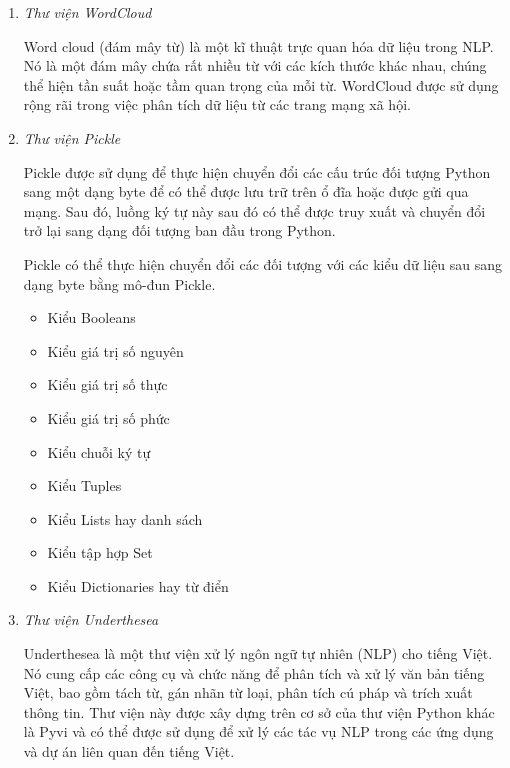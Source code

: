 \begin{enumerate}
    \item \textit{Thư viện WordCloud}

          Word cloud (đám mây từ) là một kĩ thuật trực quan hóa dữ liệu trong NLP. Nó là một đám mây chứa rất nhiều từ với các kích thước khác nhau, chúng thể hiện tần suất hoặc tầm quan trọng của mỗi từ. WordCloud được sử dụng rộng rãi trong việc phân tích dữ liệu từ các trang mạng xã hội\cite{webpage17}.

    \item \textit{Thư viện Pickle}

          Pickle được sử dụng để thực hiện chuyển đổi các cấu trúc đối tượng Python sang một dạng byte để có thể được lưu trữ trên ổ đĩa hoặc được gửi qua mạng. Sau đó, luồng ký tự này sau đó có thể được truy xuất và chuyển đổi trở lại sang dạng đối tượng ban đầu trong Python\cite{webpage18}.

          Pickle có thể thực hiện chuyển đổi các đối tượng với các kiểu dữ liệu sau sang dạng byte bằng mô-đun Pickle.
          \begin{itemize}
              \item Kiểu Booleans
              \item Kiểu giá trị số nguyên
              \item Kiểu giá trị số thực
              \item Kiểu giá trị số phức
              \item Kiểu chuỗi ký tự
              \item Kiểu Tuples
              \item Kiểu Lists hay danh sách
              \item Kiểu tập hợp Set
              \item Kiểu Dictionaries hay từ điển
          \end{itemize}

    \item \textit{Thư viện Underthesea}

          Underthesea là một thư viện xử lý ngôn ngữ tự nhiên (NLP) cho tiếng Việt. Nó cung cấp các công cụ và chức năng để phân tích và xử lý văn bản tiếng Việt, bao gồm tách từ, gán nhãn từ loại, phân tích cú pháp và trích xuất thông tin. Thư viện này được xây dựng trên cơ sở của thư viện Python khác là Pyvi và có thể được sử dụng để xử lý các tác vụ NLP trong các ứng dụng và dự án liên quan đến tiếng Việt.


\end{enumerate}
